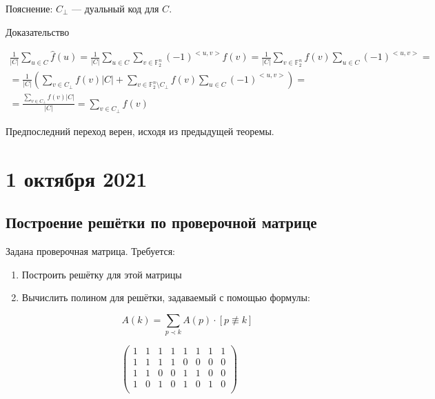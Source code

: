\documentclass{article}
\begin{document}
Пояснение: $C_\bot$ --- дуальный код для $C$.

Доказательство

\begin{equation*}
\begin{gathered}
\frac{1}{|C|} \sum_{u \in C} \hat{f}(u) = \frac{1}{|C|} \sum_{u \in C} \sum_{v \in \mathbb{F}_2^n} (-1)^{<u, v>} f(v) = \frac{1}{|C|} \sum_{v \in \mathbb{F}_2^n} f(v) \sum_{u \in C}  (-1)^{<u, v>} = \\
= \frac{1}{|C|} \left( \sum_{v \in C_\bot} f(v) |C| + \sum_{v \in \mathbb{F}_2^n \setminus C_\bot} f(v) \sum_{u \in C}  (-1)^{<u, v>} \right) = \\
= \frac{\sum_{v \in C_\bot} f(v) |C|}{|C|} = \sum_{v \in C_\bot} f(v)
\end{gathered}
\end{equation*}

Предпоследний переход верен, исходя из предыдущей теоремы.

\newpage
\section*{1 октября 2021}

\subsection*{Построение решётки по проверочной матрице}

Задана проверочная матрица. Требуется:
\begin{enumerate}
\item Построить решётку для этой матрицы
\item Вычислить полином для решётки, задаваемый с помощью формулы:

$$A(k) = \sum_{p \prec k} A(p) \cdot [p \not\equiv k]$$
\end{enumerate}

\begin{equation}
\begin{pmatrix}
1 & 1 & 1 & 1 & 1 & 1 & 1 & 1 \\
1 & 1 & 1 & 1 & 0 & 0 & 0 & 0 \\
1 & 1 & 0 & 0 & 1 & 1 & 0 & 0 \\
1 & 0 & 1 & 0 & 1 & 0 & 1 & 0 \\
\end{pmatrix}
\end{equation}
\end{document}
